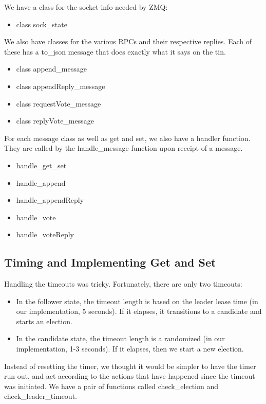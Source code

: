 \documentclass{article}
\begin{document}
We have a class for the socket info needed by ZMQ:
\begin{itemize}
\item class sock\_state
\end{itemize}

We also have classes for the various RPCs and their respective replies. Each of these has a to\_json message that does exactly what it says on the tin.
\begin{itemize}
\item class append\_message
\item class appendReply\_message
\item class requestVote\_message
\item class replyVote\_message
\end{itemize}

For each message class as well as get and set, we also have a handler function. They are called by the handle\_message function upon receipt of a message.
\begin{itemize}
\item handle\_get\_set
\item handle\_append
\item handle\_appendReply
\item handle\_vote
\item handle\_voteReply
\end{itemize}

\newpage

\subsection{Timing and Implementing Get and Set}

Handling the timeouts was tricky. Fortunately, there are only two timeouts: 
\begin{itemize}
\item In the follower state, the timeout length is based on the leader lease time (in our implementation, 5 seconds). If it elapses, it transitions to a candidate and starts an election.
\item In the candidate state, the timeout length is a randomized (in our implementation, 1-3 seconds). If it elapses, then we start a new election.
\end{itemize}

Instead of resetting the timer, we thought it would be simpler to have the timer run out, and act according to the actions that have happened since the timeout was initiated. We have a pair of functions called check\_election and check\_leader\_timeout.
\end{document}
